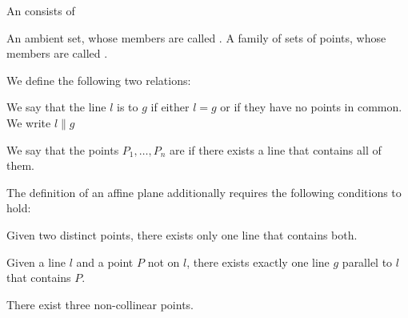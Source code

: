 \begin{definition}\label{def:affine_plane}
  An  consists of
  \begin{thmenum}[series=def:affine_plane]
     An ambient set, whose members are called .
     A family of sets of points, whose members are called .
  \end{thmenum}

  We define the following two relations:
  \begin{thmenum}[resume=def:affine_plane]
     We say that the line \( l \) is  to \( g \) if either \( l = g \) or if they have no points in common. We write \( l \parallel g \)

     We say that the points \( P_1, \ldots, P_n \) are  if there exists a line that contains all of them.
  \end{thmenum}

  The definition of an affine plane additionally requires the following conditions to hold:
  \begin{thmenum}
     Given two distinct points, there exists only one line that contains both.

     Given a line \( l \) and a point \( P \) not on \( l \), there exists exactly one line \( g \) parallel to \( l \) that contains \( P \).

     There exist three non-collinear points.
  \end{thmenum}
\end{definition}


